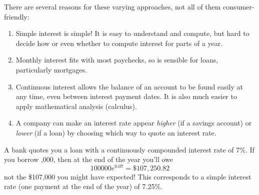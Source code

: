 There are several reasons for these varying approaches, not all of them consumer-friendly:
\begin{enumerate}\itemsep0pt
  \item Simple interest is simple! It is easy to understand and compute, but hard to decide how or even whether to compute interest for parts of a year.
  \item Monthly interest fits with most paychecks, so is sensible for loans, particularly mortgages.
  \item Continuous interest allows the balance of an account to be found easily at any time, even between interest payment dates. It is also much easier to apply mathematical analysis (calculus).
  \item A company can make an interest rate appear \emph{higher} (if a savings account) or \emph{lower} (if a loan) by choosing which way to quote an interest rate.
\end{enumerate}


\begin{example}{}{}
	A bank quotes you a loan with a continuously compounded interest rate of 7\%. If you borrow ,000, then at the end of the year you'll owe
		\[
			100000e^{0.07} =\$107,250.82
		\]
		not the \$107,000 you might have expected! This corresponds to a simple interest rate (one payment at the end of the year) of 7.25\%.\footnotemark{}
\end{example}




